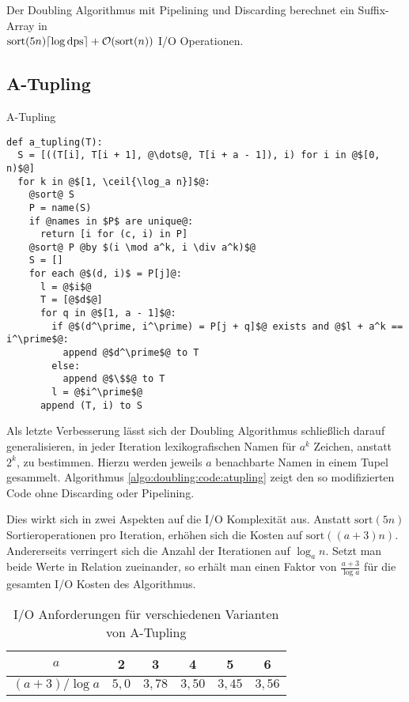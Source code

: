 \begin{theorem}
Der Doubling Algorithmus mit Pipelining und Discarding berechnet ein Suffix-Array in\\ $\text{sort}(5n) \ceil*{\log \text{dps}} +  \mathcal{O}(\text{sort}(n))$ I/O Operationen.
\end{theorem}

\subsection{A-Tupling}
\label{algo:doubling:sec:tupling}
\begin{listing}[htp]
\caption{A-Tupling} 
\label{algo:doubling:code:atupling}
\begin{verbatim}
def a_tupling(T):
  S = [((T[i], T[i + 1], @\dots@, T[i + a - 1]), i) for i in @$[0, n)$@]
  for k in @$[1, \ceil{\log_a n}]$@:
    @sort@ S
    P = name(S)
    if @names in $P$ are unique@:
      return [i for (c, i) in P]
    @sort@ P @by $(i \mod a^k, i \div a^k)$@
    S = []
    for each @$(d, i)$ = P[j]@:
      l = @$i$@
      T = [@$d$@]
      for q in @$[1, a - 1]$@:
        if @$(d^\prime, i^\prime) = P[j + q]$@ exists and @$l + a^k == i^\prime$@:
          append @$d^\prime$@ to T
        else:
          append @$\$$@ to T
        l = @$i^\prime$@
      append (T, i) to S
\end{verbatim}
\end{listing}

Als letzte Verbesserung lässt sich der Doubling Algorithmus schließlich darauf generalisieren, in jeder Iteration lexikografischen Namen für $a^k$ Zeichen, anstatt $2^k$, zu bestimmen. Hierzu werden jeweils $a$ benachbarte Namen in einem Tupel gesammelt. Algorithmus \ref{algo:doubling:code:atupling} zeigt den so modifizierten Code ohne Discarding oder Pipelining.

Dies wirkt sich in zwei Aspekten auf die I/O Komplexität aus. Anstatt $\text{sort}(5n)$ Sortieroperationen pro Iteration, erhöhen sich die Kosten auf $\text{sort}((a+3)n)$. Andererseits verringert sich die Anzahl der Iterationen auf $\log_a n$. Setzt man beide Werte in Relation zueinander, so erhält man einen Faktor von $\frac{a + 3}{\log a}$ für die gesamten I/O Kosten des Algorithmus. 

\begin{table}
\caption{I/O Anforderungen für verschiedenen Varianten von A-Tupling}
\label{algo:doubling:tab:tab1}
\centering
\begin{tabular}{cccccc}
\toprule
$a$ & 2 & 3 & 4 & 5 & 6 \\ 
\midrule 
$(a+3) / \log a$ & $5,0$ & $3,78$ & $3,50$ & $3,45$ & $3,56$ \\ 
\bottomrule
\end{tabular} 
\end{table}

